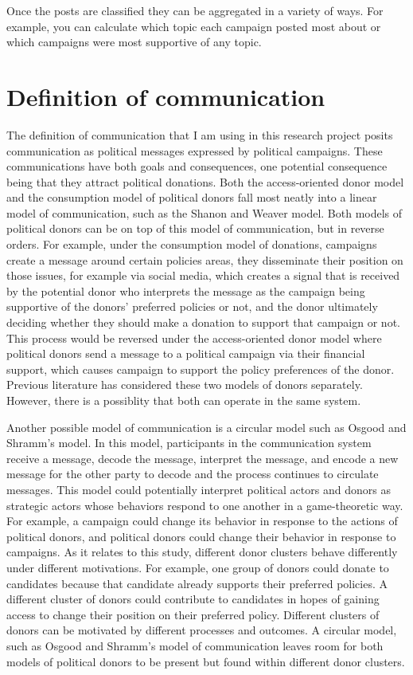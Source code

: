 \documentclass[12pt,]{article}
\begin{document}
Once the posts are classified they can be aggregated in a variety of
ways. For example, you can calculate which topic each campaign posted
most about or which campaigns were most supportive of any topic.

\hypertarget{definition-of-communication}{%
\section{Definition of
communication}\label{definition-of-communication}}

The definition of communication that I am using in this research project
posits communication as political messages expressed by political
campaigns. These communications have both goals and consequences, one
potential consequence being that they attract political donations. Both
the access-oriented donor model and the consumption model of political
donors fall most neatly into a linear model of communication, such as
the Shanon and Weaver model. Both models of political donors can be on
top of this model of communication, but in reverse orders. For example,
under the consumption model of donations, campaigns create a message
around certain policies areas, they disseminate their position on those
issues, for example via social media, which creates a signal that is
received by the potential donor who interprets the message as the
campaign being supportive of the donors' preferred policies or not, and
the donor ultimately deciding whether they should make a donation to
support that campaign or not. This process would be reversed under the
access-oriented donor model where political donors send a message to a
political campaign via their financial support, which causes campaign to
support the policy preferences of the donor. Previous literature has
considered these two models of donors separately. However, there is a
possiblity that both can operate in the same system.

Another possible model of communication is a circular model such as
Osgood and Shramm's model. In this model, participants in the
communication system receive a message, decode the message, interpret
the message, and encode a new message for the other party to decode and
the process continues to circulate messages. This model could
potentially interpret political actors and donors as strategic actors
whose behaviors respond to one another in a game-theoretic way. For
example, a campaign could change its behavior in response to the actions
of political donors, and political donors could change their behavior in
response to campaigns. As it relates to this study, different donor
clusters behave differently under different motivations. For example,
one group of donors could donate to candidates because that candidate
already supports their preferred policies. A different cluster of donors
could contribute to candidates in hopes of gaining access to change
their position on their preferred policy. Different clusters of donors
can be motivated by different processes and outcomes. A circular model,
such as Osgood and Shramm's model of communication leaves room for both
models of political donors to be present but found within different
donor clusters.
\end{document}

